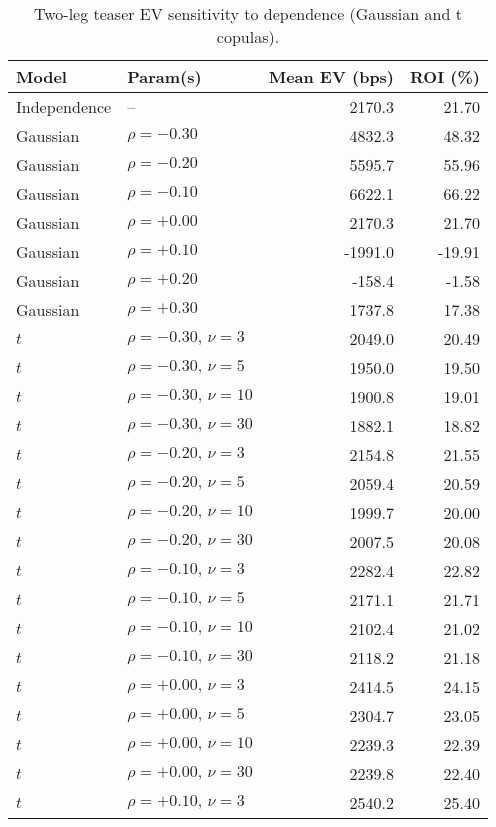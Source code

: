 \begin{table}[t]
  \centering
  \small
  \caption{Two-leg teaser EV sensitivity to dependence (Gaussian and t copulas).}
  \begin{tabular}{l l r r}
    \toprule
    Model & Param(s) & Mean EV (bps) & ROI (\%) \\
    \midrule
    Independence & -- & 2170.3 & 21.70 \\
    \midrule
    Gaussian & $\rho=-0.30$ & 4832.3 & 48.32 \\
    Gaussian & $\rho=-0.20$ & 5595.7 & 55.96 \\
    Gaussian & $\rho=-0.10$ & 6622.1 & 66.22 \\
    Gaussian & $\rho=+0.00$ & 2170.3 & 21.70 \\
    Gaussian & $\rho=+0.10$ & -1991.0 & -19.91 \\
    Gaussian & $\rho=+0.20$ & -158.4 & -1.58 \\
    Gaussian & $\rho=+0.30$ & 1737.8 & 17.38 \\
    \midrule
    $t$ & $\rho=-0.30,\,\nu=3$ & 2049.0 & 20.49 \\
    $t$ & $\rho=-0.30,\,\nu=5$ & 1950.0 & 19.50 \\
    $t$ & $\rho=-0.30,\,\nu=10$ & 1900.8 & 19.01 \\
    $t$ & $\rho=-0.30,\,\nu=30$ & 1882.1 & 18.82 \\
    $t$ & $\rho=-0.20,\,\nu=3$ & 2154.8 & 21.55 \\
    $t$ & $\rho=-0.20,\,\nu=5$ & 2059.4 & 20.59 \\
    $t$ & $\rho=-0.20,\,\nu=10$ & 1999.7 & 20.00 \\
    $t$ & $\rho=-0.20,\,\nu=30$ & 2007.5 & 20.08 \\
    $t$ & $\rho=-0.10,\,\nu=3$ & 2282.4 & 22.82 \\
    $t$ & $\rho=-0.10,\,\nu=5$ & 2171.1 & 21.71 \\
    $t$ & $\rho=-0.10,\,\nu=10$ & 2102.4 & 21.02 \\
    $t$ & $\rho=-0.10,\,\nu=30$ & 2118.2 & 21.18 \\
    $t$ & $\rho=+0.00,\,\nu=3$ & 2414.5 & 24.15 \\
    $t$ & $\rho=+0.00,\,\nu=5$ & 2304.7 & 23.05 \\
    $t$ & $\rho=+0.00,\,\nu=10$ & 2239.3 & 22.39 \\
    $t$ & $\rho=+0.00,\,\nu=30$ & 2239.8 & 22.40 \\
    $t$ & $\rho=+0.10,\,\nu=3$ & 2540.2 & 25.40 \\

\end{tabular}
\end{table}
